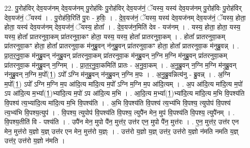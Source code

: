 \documentclass[17pt]{extarticle}
\begin{document}
22. पु॒रोह॑विर् देव॒यज॑नम् देव॒यज॑नम् पु॒रोह॑विः पु॒रोह॑विर् देव॒यज॑नं॒ ॅयस्य॒ यस्य॑ देव॒यज॑नम् पु॒रोह॑विः पु॒रोह॑विर् देव॒यज॑नं॒ ॅयस्य॑ । . पु॒रोह॑वि॒रिति॑ पु॒रः - ह॒विः॒ । . दे॒व॒यज॑नं॒ ॅयस्य॒ यस्य॑ देव॒यज॑नम् देव॒यज॑नं॒ ॅयस्य॒ होता॒ होता॒ यस्य॑ देव॒यज॑नम् देव॒यज॑नं॒ ॅयस्य॒ होता᳚ । . दे॒व॒यज॑न॒मिति॑ देव - यज॑नम् । . यस्य॒ होता॒ होता॒ यस्य॒ यस्य॒ होता᳚ प्रातरनुवा॒कम् प्रा॑तरनुवा॒कꣳ होता॒ यस्य॒ यस्य॒ होता᳚ प्रातरनुवा॒कम् । . होता᳚ प्रातरनुवा॒कम् प्रा॑तरनुवा॒कꣳ होता॒ होता᳚ प्रातरनुवा॒क म॑नुब्रु॒वन् न॑नुब्रु॒वन् प्रा॑तरनुवा॒कꣳ होता॒ होता᳚ प्रातरनुवा॒क म॑नुब्रु॒वन्न् । . प्रा॒त॒र॒नु॒वा॒क म॑नुब्रु॒वन् न॑नुब्रु॒वन् प्रा॑तरनुवा॒कम् प्रा॑तरनुवा॒क म॑नुब्रु॒वन् न॒ग्नि म॒ग्नि म॑नुब्रु॒वन् प्रा॑तरनुवा॒कम् प्रा॑तरनुवा॒क म॑नुब्रु॒वन् न॒ग्निम् । . प्रा॒त॒र॒नु॒वा॒कमिति॑ प्रातः - अ॒नु॒वा॒कम् । . अ॒नु॒ब्रु॒वन् न॒ग्नि म॒ग्नि म॑नुब्रु॒वन् न॑नुब्रु॒वन् न॒ग्नि म॒पो᳚(1॒) ऽपो᳚ ऽग्नि म॑नुब्रु॒वन् न॑नुब्रु॒वन् न॒ग्नि म॒पः । . अ॒नु॒ब्रु॒वन्नित्य॑नु - ब्रु॒वन्न् । . अ॒ग्नि म॒पो᳚(1॒) ऽपो᳚ ऽग्नि म॒ग्नि म॒प आ॑दि॒त्य मा॑दि॒त्य म॒पो᳚ ऽग्नि म॒ग्नि म॒प आ॑दि॒त्यम् । . अ॒प आ॑दि॒त्य मा॑दि॒त्य म॒पो॑ ऽप आ॑दि॒त्य म॒भ्या᳚(1॒)भ्या॑दि॒त्य म॒पो॑ ऽप आ॑दि॒त्य म॒भि । . आ॒दि॒त्य म॒भ्या᳚(1॒)भ्या॑दि॒त्य मा॑दि॒त्य म॒भि वि॒पश्य॑ति वि॒पश्य॑ त्य॒भ्या॑दि॒त्य मा॑दि॒त्य म॒भि वि॒पश्य॑ति । . अ॒भि वि॒पश्य॑ति वि॒पश्य॑ त्य॒भ्य॑भि वि॒पश्य॒ त्युपोप॑ वि॒पश्य॑ त्य॒भ्य॑भि वि॒पश्य॒त्युप॑ । . वि॒पश्य॒ त्युपोप॑ वि॒पश्य॑ति वि॒पश्य॒ त्युपै॑न मेन॒ मुप॑ वि॒पश्य॑ति वि॒पश्य॒ त्युपै॑नम् । . वि॒पश्य॒तीति॑ वि - पश्य॑ति । . उपै॑न मेन॒ मुपो पै॑न॒ मुत्त॑र॒ उत्त॑र एन॒ मुपो पै॑न॒ मुत्त॑रः । . ए॒न॒ मुत्त॑र॒ उत्त॑र एन मेन॒ मुत्त॑रो य॒ज्ञो य॒ज्ञ् उत्त॑र एन मेन॒ मुत्त॑रो य॒ज्ञ्ः । . उत्त॑रो य॒ज्ञो य॒ज्ञ् उत्त॑र॒ उत्त॑रो य॒ज्ञो न॑मति नमति य॒ज्ञ् उत्त॑र॒ उत्त॑रो य॒ज्ञो न॑मति । \newline
\end{document}
